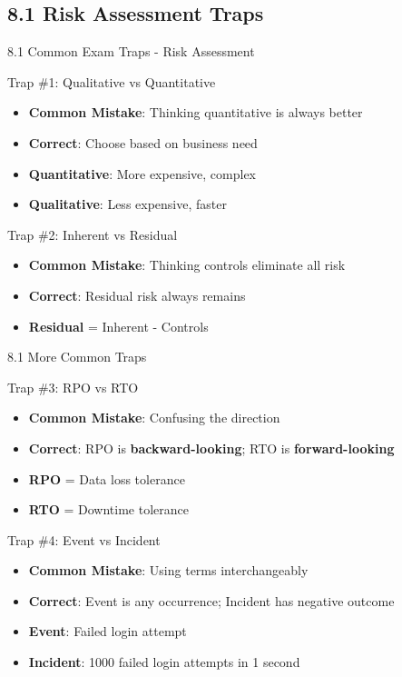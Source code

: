 \documentclass[9pt]{beamer}  %
\begin{document}
	\subsection{8.1 Risk Assessment Traps}
	\begin{frame}{8.1 Common Exam Traps - Risk Assessment}
		\begin{block}{Trap \#1: Qualitative vs Quantitative}
			\begin{itemize}
				\item \textbf{Common Mistake}: Thinking quantitative is always better
				\item \textbf{Correct}: Choose based on business need
				\item \textbf{Quantitative}: More expensive, complex
				\item \textbf{Qualitative}: Less expensive, faster
			\end{itemize}
		\end{block}
		
		\begin{block}{Trap \#2: Inherent vs Residual}
			\begin{itemize}
				\item \textbf{Common Mistake}: Thinking controls eliminate all risk
				\item \textbf{Correct}: Residual risk always remains
				\item \textbf{Residual} = Inherent - Controls
			\end{itemize}
		\end{block}
	\end{frame}
	
	\begin{frame}{8.1 More Common Traps}
		\begin{block}{Trap \#3: RPO vs RTO}
			\begin{itemize}
				\item \textbf{Common Mistake}: Confusing the direction
				\item \textbf{Correct}: RPO is \textbf{backward-looking}; RTO is \textbf{forward-looking}
				\item \textbf{RPO} = Data loss tolerance
				\item \textbf{RTO} = Downtime tolerance
			\end{itemize}
		\end{block}
		
		\begin{block}{Trap \#4: Event vs Incident}
			\begin{itemize}
				\item \textbf{Common Mistake}: Using terms interchangeably
				\item \textbf{Correct}: Event is any occurrence; Incident has negative outcome
				\item \textbf{Event}: Failed login attempt
				\item \textbf{Incident}: 1000 failed login attempts in 1 second
			\end{itemize}
		\end{block}
	\end{frame}
	
\end{document}
